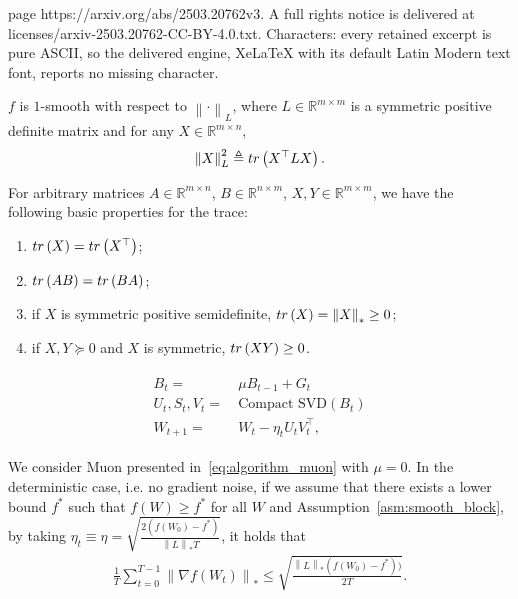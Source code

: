 \documentclass[10pt,a4paper]{amsart}
\newcommand{\Norm}[1]{\left\|#1\right\|}
\newcommand{\RR}{\mathbb{R}}
\newcommand{\tr}[1]{{\rm tr}\left( #1 \right)}
\begin{document}
page https://arxiv.org/abs/2503.20762v3. A full rights notice is delivered at licenses/arxiv-2503.20762-CC-BY-4.0.txt. Characters: every retained excerpt is pure ASCII, so the delivered engine, XeLaTeX with its default Latin Modern text font, reports no missing character.
\begin{assumption}[Smoothness]\label{asm:smooth_block}
    $f$ is $1$-smooth with respect to $\Norm{\cdot}_L$, where $L \in \RR^{m\times m}$ is a symmetric positive definite matrix and for any $X \in \RR^{m\times n}$,
    \begin{align*}
        \Norm{X}_L^2 \triangleq \tr{X^\top L X} .
    \end{align*}
\end{assumption}

\begin{lemma}\label{lem:trace_properties}
    For arbitrary matrices $A \in \RR^{m\times n}$, $B \in \RR^{n\times m}$, $X,Y \in \RR^{m\times m}$, we have the following basic properties for the trace:
    \begin{enumerate}
        \item $\tr{X} = \tr{X^\top}$;
        \item $\tr{AB} = \tr{B A}$;
        \item if $X$ is symmetric positive semidefinite, $\tr{X} = \Norm{X}_* \ge 0$;
        \item if $X, Y \succeq 0$ and $X$ is symmetric, $\tr{XY} \ge 0$.
    \end{enumerate}
\end{lemma}

\begin{align}\label{eq:algorithm_muon}
\begin{split}
    B_t =& \ \mu B_{t-1} + G_t \\
    U_t, S_t, V_t =& \ \text{Compact SVD}(B_t) \\
    W_{t+1} =& \ W_t - \eta_t U_t V_t^\top,
\end{split}
\end{align}

\begin{theorem}\label{thm:muon_nonconvex}
    We consider Muon presented in~\eqref{eq:algorithm_muon} with $\mu=0$. In the deterministic case, i.e. no gradient noise, if we assume that there exists a lower bound $f^*$ such that $f(W) \ge f^*$ for all $W$ and Assumption~\ref{asm:smooth_block}, by taking $\eta_t \equiv \eta = \sqrt{\frac{2(f(W_0) - f^*)}{ \Norm{L}_* T}}$, it holds that
    \begin{align*}
        \frac{1}{T} \sum_{t=0}^{T-1} \Norm{\nabla f(W_t)}_* \le \sqrt{\frac{\Norm{L}_* (f(W_0) - f^*))}{2T} } .
    \end{align*}
\end{theorem}
\end{document}
